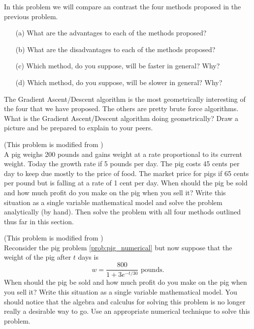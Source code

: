 \begin{problem}
    In this problem we will compare an contrast the four methods proposed in the previous
    problem.
    \begin{enumerate}
        \item[(a)] What are the advantages to each of the methods proposed?
        \item[(b)] What are the disadvantages to each of the methods proposed?
        \item[(c)] Which method, do you suppose, will be faster in general?  Why?
        \item[(d)] Which method, do you suppose, will be slower in general?  Why?
    \end{enumerate}
\end{problem}

\begin{problem}
    The Gradient Ascent/Descent algorithm is the most geometrically interesting of the
    four that we have proposed.  The others are pretty brute force algorithms.  What is
    the Gradient Ascent/Descent algorithm doing geometrically?  Draw a picture and be
    prepared to explain to your peers.
\end{problem}


\begin{problem}\label{prob:pig_numerical}
    (This problem is modified from \cite{Meerschaert}) \\
    A pig weighs 200 pounds and gains weight at a rate proportional to its current weight.
    Today the growth rate if 5 pounds per day.  The pig costs 45 cents per day to keep due
    mostly to the price of food.  The market price for pigs if 65 cents per pound but is
    falling at a rate of 1 cent per day.  When should the pig be sold and how much profit
    do you make on the pig when you sell it?  Write this situation as a single variable
    mathematical model and solve the problem analytically (by hand).  Then solve the
    problem with all four methods outlined thus far in this section.
\end{problem}

\begin{problem}
    (This problem is modified from \cite{Meerschaert}) \\
    Reconsider the pig problem \ref{prob:pig_numerical} but now suppose that the weight of
    the pig after $t$ days is 
    \[ w = \frac{800}{1+3e^{-t/30}} \text{ pounds}. \]
    When should the pig be sold and how much profit do you make on the pig when you sell
    it?  Write this situation as a single variable mathematical model.  You should notice
    that the algebra and calculus for solving this problem is no longer really a desirable
    way to go.  Use an appropriate numerical technique to solve this problem.
\end{problem}



